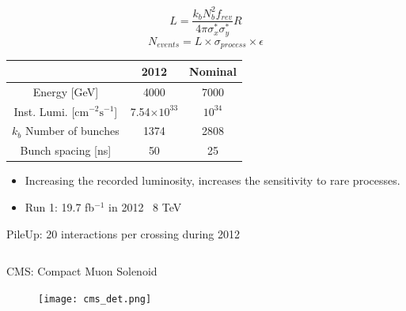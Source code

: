 \begin{frame}{}
\begin{columns}
\begin{column}{.50\textwidth}
\begin{block}{}
\begin{equation*}
  L=\frac{k_{b}N_{b}^{2}f_{rev}}{4\pi\sigma^{*}_{x}\sigma^{*}_{y}}R                                     
\end{equation*}
\begin{equation*}
  N_{events}=L\times \sigma_{process} \times \epsilon
\end{equation*}
\end{block}

\tiny{
\begin{center}
\begin{tabular}{|c|c c|}
\hline
 & 2012 & Nominal \\
\hline
Energy [GeV]& 4000 & 7000 \\
Inst. Lumi. [$\text{cm}^{-2}\text{s}^{-1}$] & 7.54$\times10^{33}$ & $10^{34}$ \\
$k_{b}$ Number of bunches & 1374 & 2808 \\
Bunch spacing [ns] & 50 & 25 \\
\hline
\end{tabular}
\end{center}
}%

\begin{block}{}
\begin{itemize}\scriptsize
\item Increasing the recorded luminosity, increases the sensitivity to rare processes.
\item Run 1: 19.7 fb$^{-1}$ in 2012 \MVAt~8 TeV
\end{itemize}
\end{block}
\begin{block}{}
\scriptsize PileUp: 20 interactions per crossing during 2012
\end{block}
\end{column}
\end{columns}

\end{frame}

\begin{frame}{CMS: Compact Muon Solenoid}
\vspace{-.2cm}

\begin{figure}[!Hhtbp]
  \begin{center}
    \texttt{[image: cms\_det.png]}
  \end{center}
\end{figure}

\end{frame}


